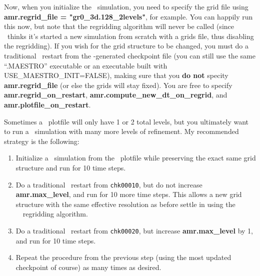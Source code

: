 Now, when you initialize the \castro\ simulation, you need to specify
the grid file using {\bf amr.regrid\_file = "gr0\_3d.128\_2levels"},
for example.  You can happily run this now, but note that the
regridding algorithm will never be called (since \castro\ thinks it's
started a new simulation from scratch with a grids file, thus
disabling the regridding).  If you wish for the grid structure to be
changed, you must do a traditional \castro\ restart from the
\castro-generated checkpoint file (you can still use the same
``.MAESTRO'' executable or an executable built with
USE\_MAESTRO\_INIT=FALSE), making sure that you {\bf do not} specity
{\bf amr.regrid\_file} (or else the grids will stay fixed).  You are
free to specify {\bf amr.regrid\_on\_restart}, {\bf
  amr.compute\_new\_dt\_on\_regrid}, and {\bf
  amr.plotfile\_on\_restart}.

Sometimes a \maestro\ plotfile will only have 1 or 2 total levels, but
you ultimately want to run a \castro\ simulation with many more levels
of refinement.  My recommended strategy is the following:
\begin{enumerate}
\item Initialize a \castro\ simulation from the \maestro\ plotfile
  while preserving the exact same grid structure and run for 10 time
  steps.
\item Do a traditional \castro\ restart from {\tt chk00010}, but do not
  increase {\bf amr.max\_level}, and run for 10 more time steps.  This
  allows a new grid structure with the same effective resolution as
  before settle in using the \cpp\ \boxlib\ regridding algorithm.
\item Do a traditional \castro\ restart from {\tt chk00020}, but increase
  {\bf amr.max\_level} by 1, and run for 10 time steps.
\item Repeat the procedure from the previous step (using the most
  updated checkpoint of course) as many times as desired.
\end{enumerate}
